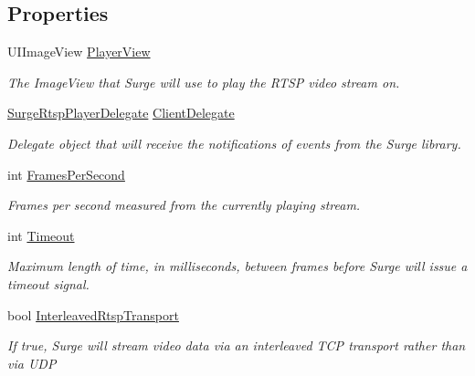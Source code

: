 \subsection*{Properties}
\begin{DoxyCompactItemize}
\item 
U\+I\+Image\+View \hyperlink{interface_surge_xamarini_o_s_bindings_1_1_surge_rtsp_player_ab629f9303d6b427a8213e1dee03a3810}{Player\+View}
\begin{DoxyCompactList}\small\item\em The Image\+View that Surge will use to play the R\+T\+SP video stream on. \end{DoxyCompactList}\item 
\hyperlink{interface_surge_xamarini_o_s_bindings_1_1_surge_rtsp_player_delegate}{Surge\+Rtsp\+Player\+Delegate} \hyperlink{interface_surge_xamarini_o_s_bindings_1_1_surge_rtsp_player_a6c7ed65f9656542894f0ccfe7e728b0e}{Client\+Delegate}
\begin{DoxyCompactList}\small\item\em Delegate object that will receive the notifications of events from the Surge library. \end{DoxyCompactList}\item 
int \hyperlink{interface_surge_xamarini_o_s_bindings_1_1_surge_rtsp_player_a84dbe2b6b5456cbe5e261057e027eb40}{Frames\+Per\+Second}
\begin{DoxyCompactList}\small\item\em Frames per second measured from the currently playing stream. \end{DoxyCompactList}\item 
int \hyperlink{interface_surge_xamarini_o_s_bindings_1_1_surge_rtsp_player_a5d41ebac63bbd4c26859615abcf1fa0e}{Timeout}
\begin{DoxyCompactList}\small\item\em Maximum length of time, in milliseconds, between frames before Surge will issue a timeout signal. \end{DoxyCompactList}\item 
bool \hyperlink{interface_surge_xamarini_o_s_bindings_1_1_surge_rtsp_player_a4a53fb4ef61b09ee4ffa0fc3a44fa9e7}{Interleaved\+Rtsp\+Transport}
\begin{DoxyCompactList}\small\item\em If true, Surge will stream video data via an interleaved T\+CP transport rather than via U\+DP \end{DoxyCompactList}\end{DoxyCompactItemize}


